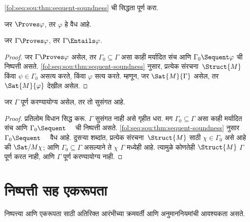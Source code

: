 \begin{prob}
\ref{fol:seq:sou:thm:sequent-soundness} ची सिद्धता पूर्ण करा.
\end{prob}




\begin{cor}
\label{fol:seq:sou:cor:weak-soundness}
जर $\Proves \varphi$, तर $\varphi$ हे वैध आहे.
\end{cor}

\begin{cor}
\label{fol:seq:sou:cor:entailment-soundness}
जर $\Gamma \Proves \varphi$, तर $\Gamma \Entails \varphi$.
\end{cor}

\begin{proof}
जर $\Gamma \Proves \varphi$ असेल, तर $\Gamma_0 \subseteq \Gamma$ असा काही
मर्यादित संच आणि $\Gamma_0 \Sequent \varphi$ ची निष्पत्ती असते. \ref{fol:seq:sou:thm:sequent-soundness}
नुसार, प्रत्येक
संरचना~$\Struct{M}$
किंवा $\psi \in \Gamma_0$ असत्य करते, किंवा $\varphi$ सत्य करते. म्हणून,
जर $\Sat{M}{\Gamma}$ असेल, तर
$\Sat{M}{\varphi}$ देखील असेल.
\end{proof}

\begin{cor}
\label{fol:seq:sou:cor:consistency-soundness}
जर $\Gamma$ पूर्ण करण्यायोग्य असेल, तर तो सुसंगत आहे.
\end{cor}

\begin{proof}
प्रतिलोम विधान सिद्ध करू. $\Gamma$ सुसंगत नाही असे गृहीत धरा. मग
$\Gamma_0 \subseteq \Gamma$ असा काही मर्यादित संच आणि
$\Gamma_0 \Sequent \quad$ ची निष्पत्ती असते. \ref{fol:seq:sou:thm:sequent-soundness}
नुसार $\Gamma_0 \Sequent \quad$ वैध आहे. दुसऱ्या शब्दांत, प्रत्येक
संरचना~$\Struct{M}$ साठी
$\chi \in \Gamma_0$ असे आहे की
$\Sat/{M}{\chi}$; आणि $\Gamma_0 \subseteq \Gamma$
असल्याने ते $\chi$ $\Gamma$ मध्येही आहे. त्यामुळे कोणतेही
$\Struct{M}$ $\Gamma$ पूर्ण करत नाही, आणि
$\Gamma$ पूर्ण करण्यायोग्य नाही.
\end{proof}









\section{निष्पत्ती सह एकरूपता}\label{fol:seq:ide:sec}

निष्पत्त्या आणि एकरूपता साठी अतिरिक्त आरंभीच्या क्रमवर्ती
आणि अनुमाननियमांची आवश्यकता असते.

